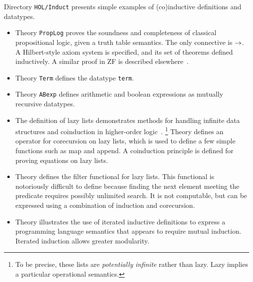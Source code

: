 Directory \texttt{HOL/Induct} presents simple examples of (co)inductive
definitions and datatypes.
\begin{itemize}
\item Theory \texttt{PropLog} proves the soundness and completeness of
  classical propositional logic, given a truth table semantics.  The only
  connective is $\rightarrow$.  A Hilbert-style axiom system is specified, and its
  set of theorems defined inductively.  A similar proof in ZF is described
  elsewhere~\cite{paulson-set-II}.

\item Theory \texttt{Term} defines the datatype \texttt{term}.

\item Theory \texttt{ABexp} defines arithmetic and boolean expressions
 as mutually recursive datatypes.

\item The definition of lazy lists demonstrates methods for handling
  infinite data structures and coinduction in higher-order
  logic~\cite{paulson-coind}.%
\footnote{To be precise, these lists are \emph{potentially infinite} rather
  than lazy.  Lazy implies a particular operational semantics.}
  Theory  defines an operator for
  corecursion on lazy lists, which is used to define a few simple functions
  such as map and append.   A coinduction principle is defined
  for proving equations on lazy lists.
  
\item Theory  defines the filter functional for lazy lists.
  This functional is notoriously difficult to define because finding the next
  element meeting the predicate requires possibly unlimited search.  It is not
  computable, but can be expressed using a combination of induction and
  corecursion.  

\item Theory  illustrates the use of iterated inductive definitions
  to express a programming language semantics that appears to require mutual
  induction.  Iterated induction allows greater modularity.
\end{itemize}

